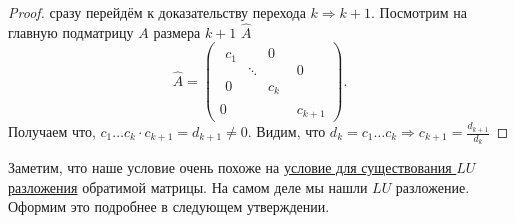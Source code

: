 \begin{proof}
    сразу перейдём к доказательству перехода $k \Rightarrow k + 1$.
    Посмотрим на главную подматрицу $A$ размера $k + 1$ $\hat{A}$
    \[
    \hat{A} = 
    \left(\begin{array}{c|c}
            \begin{array}{ccc}
                c_1 & & 0\\
                    &\ddots&\\
                0&&c_k
            \end{array} & 0 \\
            \hline
            0 & c_{k + 1}
    \end{array}\right)
    .\] 
    Получаем что, $c_1\dots c_k \cdot c_{k + 1} = d_{k + 1}\not=0$.
    Видим, что $d_k = c_1 \dots c_k \Rightarrow c_{k+1} = \frac{d_{k+1}}{d_{k}}$
\end{proof}
\begin{remark}
    Заметим, что наше условие очень похоже на 
    \hyperref[thm:LU разложение обратимой матрицы]
    {условие для существования $LU$ разложения} обратимой матрицы.
    На самом деле мы нашли $LU$ разложение.
    Оформим это подробнее в следующем утверждении.
\end{remark}
